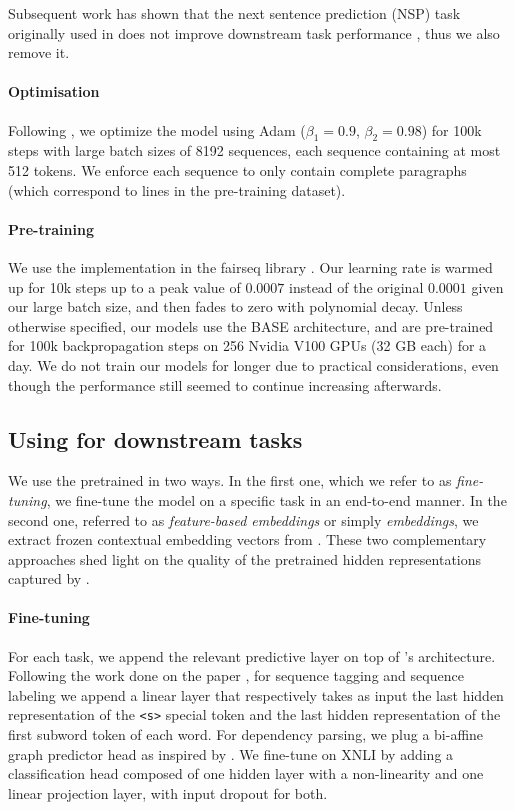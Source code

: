 Subsequent work has shown that the next sentence prediction (NSP) task originally used in \bert does not improve downstream task performance \citep{conneau-lample-2019-cross,liu-etal-2019-roberta}, thus we also remove it.

\paragraph{Optimisation}
Following \citep{liu-etal-2019-roberta}, we optimize the model using Adam \citep{kingma-ba-2015-adam} ($\beta_1 = 0.9$, $\beta_2 = 0.98$) for 100k steps with large batch sizes of 8192 sequences, each sequence containing at most 512 tokens. We enforce each sequence to only contain complete paragraphs (which correspond to lines in the pre-training dataset).

\paragraph{Pre-training}
We use the \roberta implementation in the fairseq library \citep{ott-etal-2019-fairseq}. Our learning rate is warmed up for 10k steps up to a peak value of $0.0007$ instead of the original $0.0001$ given our large batch size, and then fades to zero with polynomial decay. Unless otherwise specified, our models use the BASE architecture, and are pre-trained for 100k backpropagation steps on 256 Nvidia V100 GPUs (32 GB each) for a day. We do not train our models for longer due to practical considerations, even though the performance still seemed to continue increasing afterwards.

\subsection{Using \camembert for downstream tasks}
We use the pretrained \camembert in two ways. In the first one, which we refer to as \textit{fine-tuning}, we fine-tune the model on a specific task in an end-to-end manner. In the second one, referred to as \textit{feature-based embeddings} or simply \textit{embeddings}, we extract frozen contextual embedding vectors from \camembert.
These two complementary approaches shed light on the quality of the pretrained hidden representations captured by \camembert.


\paragraph{Fine-tuning}
For each task, we append the relevant predictive layer on top of \camembert's  architecture. Following the work done on the \bert paper \citep{devlin-etal-2019-bert}, for sequence tagging and sequence labeling we append a linear layer that respectively takes as input the last hidden representation of the \texttt{<s>} special token and the last hidden representation of the first subword token of each word. For dependency parsing, we plug a bi-affine graph predictor head as inspired by \citet{dozat-manning-2017-deep}. We fine-tune on XNLI by adding a classification head composed of one hidden layer with a non-linearity and one linear projection layer, with input dropout for both.

